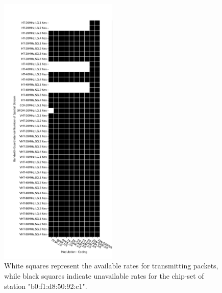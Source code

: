 \begin{figure}[hbt!]
  \centering
  \includegraphics[width=0.5\textwidth]{figures/plots/Scenario-1/G1-invertmap-b0:f1:d8:50:92:c1-22-1652-351697.png}
  \caption[Available rates per station]{White squares represent the available rates for transmitting packets, while black squares indicate unavailable rates for the chip-set of station "b0:f1:d8:50:92:c1".}
  \label{fig:STA}
\end{figure}
\FloatBarrier 


